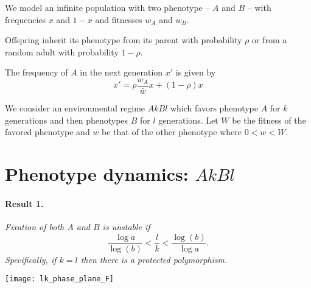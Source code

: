 \documentclass[a0,landscape]{a0poster}
\begin{document}
\begin{multicols}{4}
We model an infinite population with two phenotype -- $A$ and $B$ -- with frequencies $x$ and $1-x$ and fitnesses $w_A$ and $w_B$.

Offspring inherit its phenotype from its parent with probability $\rho$ or from a random adult with probability $1-\rho$.

The frequency of $A$ in the next generation $x'$ is given by
\begin{equation}
x' = \rho \frac{w_A}{\bar{w}}x + (1-\rho) x
\end{equation}

We consider an environmental regime $AkBl$ which favors phenotype $A$ for $k$ generations and then phenotypes $B$ for $l$ generations.
Let $W$ be the fitness of the favored phenotype and $w$ be that of the other phenotype where $0<w<W$.

%
%

\section*{Phenotype dynamics: $AkBl$}

\paragraph*{Result 1.}\textit{Fixation of both $A$ and $B$ is unstable if
\begin{equation}
\frac{\log a}{\log(b)} < \frac{l}{k} < \frac{\log(b)}{\log a}.
\end{equation} 
Specifically, if $k=l$ then there is a protected polymorphism.}

\begin{center}\vspace{1cm}
\texttt{[image: lk\_phase\_plane\_F]}
\end{center}\vspace{1cm}


\end{multicols}
\end{document}
